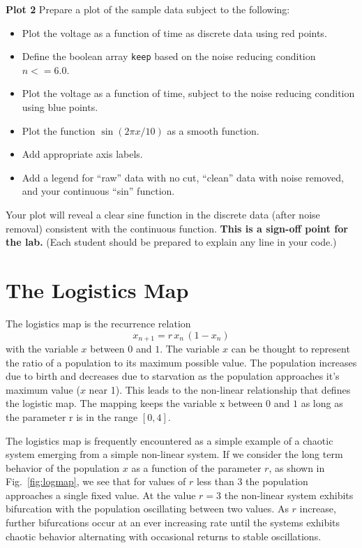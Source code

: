 \noindent
{\bf Plot 2} Prepare a plot of the sample data subject to the following:
\begin{itemize}
 \item Plot the voltage as a function of time as discrete data using red points.
 \item Define the boolean array {\tt keep} based on the noise reducing condition $n<=6.0$.
 \item Plot the voltage as a function of time, subject to the noise reducing condition using blue points.
 \item Plot the function $\sin(2 \pi x / 10)$ as a smooth function.
 \item Add appropriate axis labels.
 \item Add a legend for ``raw'' data with no cut, ``clean'' data with noise removed, and your continuous ``sin'' function.   
\end{itemize}
Your plot will reveal a clear sine function in the discrete data (after noise removal) consistent with the continuous function.  {\bf This is a sign-off point for the lab.}   (Each student should be prepared to explain any line in your code.)

\section{The Logistics Map}
The logistics map is the recurrence relation
\begin{displaymath}
x_{n+1} = r \, x_n \, (1 - x_n)
\end{displaymath}
with the variable $x$ between $0$ and $1$.  The variable $x$ can be thought to represent the ratio of a population to its maximum possible value.  The population increases due to birth and decreases due to starvation as the population approaches it's maximum value ($x$ near 1).  This leads to the non-linear relationship that defines the logistic map.   The mapping keeps the variable x between $0$ and $1$ as long as the parameter r is in the range $[0,4]$.

The logistics map is frequently encountered as a simple example of a chaotic system emerging from a simple non-linear system.  If we consider the long term behavior of the population $x$ as a function of the parameter $r$, as shown in Fig.~\ref{fig:logmap}, we see that for values of $r$ less than $3$ the population approaches a single fixed value.  At the value $r=3$ the non-linear system exhibits bifurcation with the population oscillating between two values.  As $r$ increase, further bifurcations occur at an ever increasing rate until the systems exhibits chaotic behavior alternating with occasional returns to stable oscillations.

